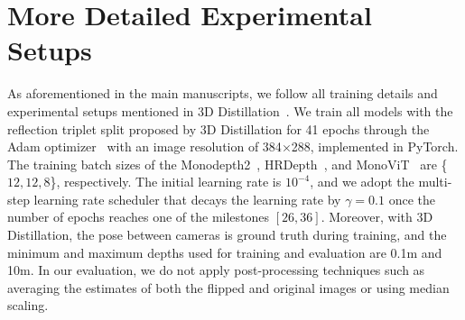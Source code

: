 \appendix
\section{More Detailed Experimental Setups}
As aforementioned in the main manuscripts, we follow all training details and experimental setups mentioned in 3D Distillation~\citep{shi20233d}.
We train all models with the reflection triplet split proposed by 3D Distillation for 41 epochs through the Adam optimizer~\citep{kingma2014adam} with an image resolution of 384$\times$288, implemented in PyTorch.
The training batch sizes of the Monodepth2~\citep{godard2019digging}, HRDepth~\citep{lyu2021hr}, and MonoViT~\citep{zhao2022monovit} are \{$12, 12, 8$\}, respectively.
The initial learning rate is $10^{-4}$, and we adopt the multi-step learning rate scheduler that decays the learning rate by $\gamma=0.1$ once the number of epochs reaches one of the milestones $[26, 36]$.
Moreover, with 3D Distillation, the pose between cameras is ground truth during training, and the minimum and maximum depths used for training and evaluation are 0.1m and 10m.
In our evaluation, we do not apply post-processing techniques such as averaging the estimates of both the flipped and original images or using median scaling.


